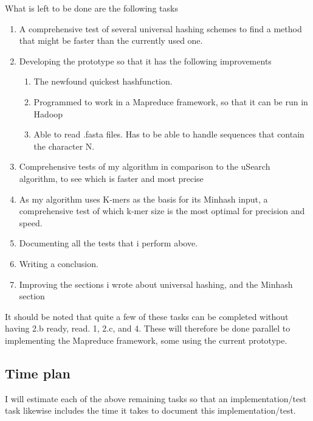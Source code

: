 \documentclass[../../main.tex]{subfiles}
\begin{document}
What is left to be done are the following tasks

\begin{enumerate}
\item A comprehensive test of several universal hashing schemes to find a method that might be faster than the currently used one.
\item Developing the prototype so that it has the following improvements
\begin{enumerate}
\item The newfound quickest hashfunction.
\item Programmed to work in a Mapreduce framework, so that it can be run in Hadoop
\item Able to read .fasta files. Has to be able to handle sequences that contain the character N.
\end{enumerate}
\item Comprehensive tests of my algorithm in comparison to the uSearch algorithm, to see which is faster and most precise
\item As my algorithm uses K-mers as the basis for its Minhash input, a comprehensive test of which k-mer size is the most optimal for precision and speed.
\item Documenting all the tests that i perform above. 
\item Writing a conclusion.
\item Improving the sections i wrote about universal hashing, and the Minhash section
\end{enumerate}

It should be noted that quite a few of these tasks can be completed without having 2.b ready, read. 1, 2.c, and 4. These will therefore be done parallel to implementing the Mapreduce framework, some using the current prototype.

\subsection{Time plan}
I will estimate each of the above remaining tasks so that an implementation/test task likewise includes the time it takes to document this implementation/test.\\
\end{document}
